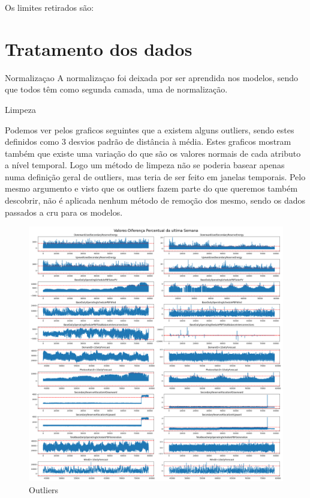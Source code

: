 Os limites retirados são:




\section{Tratamento dos dados \label{se:data_treatment}}

Normalizaçao
A normalizaçao foi deixada por ser aprendida nos modelos, sendo que todos têm como segunda camada, uma de normalização.

Limpeza

Podemos ver pelos graficos seguintes que a existem alguns outliers, sendo estes definidos como 3 desvios padrão de distância à média.
Estes graficos mostram também que existe uma variação do que são os valores normais de cada atributo a nível temporal. Logo um método de limpeza não se poderia basear apenas numa definição geral de outliers, mas teria de ser feito em janelas temporais.
Pelo mesmo argumento e visto que os outliers fazem parte do que queremos também descobrir, não é aplicada nenhum método de remoção dos mesmo, sendo os dados passados a cru para os modelos.


\begin{figure}[H]
  \centering
  \includegraphics[width=\textwidth]{../plots/Outliers_3stds.png}
  \caption{Outliers}
\end{figure}

